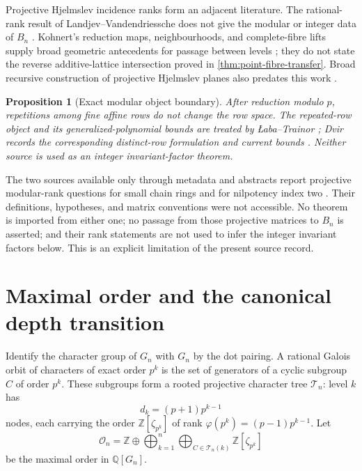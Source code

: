 \documentclass[12pt,a4paper]{article}
\newtheorem{proposition}[theorem]{Proposition}
\theoremstyle{definition}
\newcommand{\Z}{\mathbb Z}
\newcommand{\Q}{\mathbb Q}
\newcommand{\OO}{\mathcal O}
\begin{document}
Projective Hjelmslev incidence ranks form an adjacent literature.  The
rational-rank result of Landjev--Vandendriessche does not give the modular or
integer data of $B_n$ \cite[Theorem~5]{LV14}.  Kohnert's reduction maps,
neighbourhoods, and complete-fibre lifts supply broad geometric antecedents
for passage between levels \cite[pp.~270--272 and Lemma~2]{KOH09}; they do
not state the reverse additive-lattice intersection proved in
\cref{thm:point-fibre-transfer}.  Broad recursive construction of projective Hjelmslev
planes also predates this work \cite[Theorem~2, pp.~291--294]{HVM89}.

\begin{proposition}[Exact modular object boundary]
\label{prop:modular-object-boundary}
After reduction modulo $p$, repetitions among fine affine rows do not change
the row space.  The repeated-row object and its generalized-polynomial
bounds are treated by \L aba--Trainor \cite[Theorem~1.3]{LT25}; Dvir records
the corresponding distinct-row formulation and current bounds
\cite{DVI26}.  Neither source is used as an integer invariant-factor theorem.
\end{proposition}

The two sources available only through metadata and abstracts report
projective modular-rank questions for small chain rings and for nilpotency
index two \cite{LAN17,BLR23}.  Their definitions, hypotheses, and matrix
conventions were not accessible.  No theorem is imported from either one;
no passage from those projective matrices to $B_n$ is asserted; and their
rank statements are not used to infer the integer invariant factors below.
This is an explicit limitation of the present source record.

\section{Maximal order and the canonical depth transition}\label{sec:S03}

Identify the character group of $G_n$ with $G_n$ by the dot pairing.  A
rational Galois orbit of characters of exact order $p^k$ is the set of
generators of a cyclic subgroup $C$ of order $p^k$.  These subgroups form a
rooted projective character tree $\mathcal T_n$: level $k$ has
\[
 d_k=(p+1)p^{k-1}
\]
nodes, each carrying the order $\Z[\zeta_{p^k}]$ of rank
$\varphi(p^k)=(p-1)p^{k-1}$.  Let
\[
 \OO_n=\Z\oplus\bigoplus_{k=1}^n
       \bigoplus_{C\in\mathcal T_n(k)}\Z[\zeta_{p^k}]
\]
be the maximal order in $\Q[G_n]$.
\end{document}

